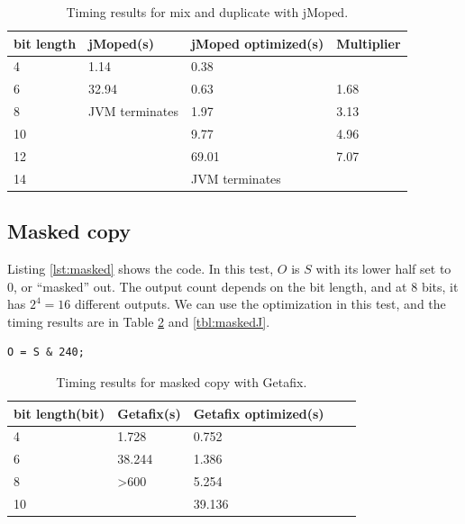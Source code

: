 \begin{table}[!h]
\begin{center}
\begin{tabular}{|l|l|l|l|}
\hline
bit length & jMoped(s) & jMoped optimized(s) & Multiplier \\ \hline
4 & 1.14 & 0.38 &  \\ \hline
6 & 32.94 & 0.63 & 1.68 \\ \hline
8 & JVM terminates & 1.97 & 3.13 \\ \hline
10 &  & 9.77 & 4.96 \\ \hline
12 &  & 69.01 & 7.07 \\ \hline
14 &  & JVM terminates &  \\ \hline
\end{tabular}
\end{center}
\caption{Timing results for mix and duplicate with jMoped.}
\label{tbl:mixJ}
\end{table}


\subsection{Masked copy}
Listing \ref{lst:masked} shows the code. In this test, $O$ is $S$ with its lower half set to $0$, or ``masked'' out. The output count depends on the bit length, and at $8$ bits, it has $2^{4} = 16$ different outputs. We can use the optimization in this test, and the timing results are in Table \ref{tbl:maskedG} and \ref{tbl:maskedJ}.

\lstset{language=C}  
\begin{lstlisting}[float=!h, caption={Masked copy test program at 8 bits.},label=lst:masked]
O = S & 240;
\end{lstlisting}

\begin{table}[!h]
\centering
\begin{tabular}{|l|l|l|l|l|}
\hline
{bit length(bit)} & Getafix(s) & {Getafix optimized(s)}\\ \hline
4 & 1.728 & 0.752  \\ \hline
6 & 38.244 & 1.386 \\ \hline
8 & \textgreater 600 & 5.254  \\ \hline
10 &  & 39.136  \\ \hline
\end{tabular}
\caption{Timing results for masked copy with Getafix.}
\label{tbl:maskedG}
\end{table}

